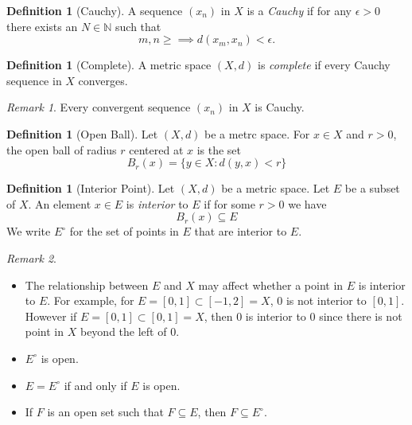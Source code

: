 \documentclass[12pt, lettersize]{book}
\theoremstyle{plain}
\theoremstyle{definition}
\newtheorem{dfn}[thm]{Definition}
\theoremstyle{remark}
\newtheorem*{rem}{Remark}
\newcommand{\N}{\mathbb{N}}
\begin{document}
	\begin{dfn}[Cauchy]
		A sequence $(x_n)$ in $X$ is a \emph{Cauchy} if for any $\epsilon>0$ there exists an $N\in\N$ such that
		\begin{displaymath}
			m,n\geq\implies d(x_m,x_n)<\epsilon.
		\end{displaymath}
	\end{dfn}
	
	\begin{dfn}[Complete]
		A metric space $(X,d)$ is \emph{complete} if every Cauchy sequence in $X$ converges.
	\end{dfn}
	\begin{rem}
		Every convergent sequence $(x_n)$ in $X$ is Cauchy.
	\end{rem}
	
	\begin{dfn}[Open Ball]
		Let $(X,d)$ be a metrc space. For $x\in X$ and $r>0$, the open ball of radius $r$ centered at $x$ is the set
		\begin{displaymath}
			B_r(x)=\{y\in X: d(y,x)<r\}
		\end{displaymath}
	\end{dfn}
	
	\begin{dfn}[Interior Point]
		Let $(X,d)$ be a metric space. Let $E$ be a subset of $X$. An element $x\in E$ is \emph{interior} to $E$ if for some $r>0$ we have
		\begin{displaymath}
			B_r(x)\subseteq E
		\end{displaymath}
		We write $E^\circ$ for the set of points in $E$ that are interior to $E$.
	\end{dfn}
	\begin{rem}
		\begin{itemize}
			\item The relationship between $E$ and $X$ may affect whether a point in $E$ is interior to $E$. For example, for $E=[0,1]\subset[-1,2]=X$, $0$ is not interior to $[0,1]$. However if $E=[0,1]\subset[0,1]=X$, then $0$ is interior to $0$ since there is not point in $X$ beyond the left of $0$.
			\item $E^\circ$ is open.
			\item $E=E^\circ$ if and only if $E$ is open.
			\item If $F$ is an open set such that $F\subseteq E$, then $F\subseteq E^\circ$.
		\end{itemize}		
	\end{rem}
	
\end{document}
